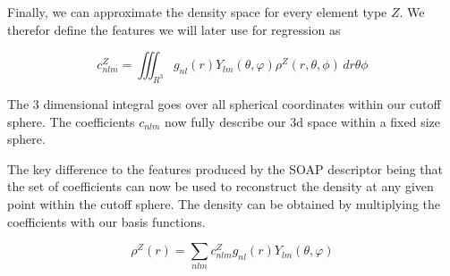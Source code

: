 Finally, we can approximate the density space for every element type $Z$.
We therefor define the features we will later use for regression as

$$ c_{nlm}^Z = \iiint_{R^3} g_{nl}(r) Y_{lm}(\theta, \varphi) \rho^Z(r, \theta, \phi)  \,dr\theta\phi   $$

The 3 dimensional integral goes over all spherical coordinates within our cutoff sphere.
The coefficients $c_{nlm}$ now fully describe our 3d space within a fixed size sphere.

The key difference to the features produced by the SOAP descriptor being that the set of coefficients 
can now be used to reconstruct the density at any given point within the cutoff sphere.
The density can be obtained by multiplying the coefficients with our basis functions.

$$ \rho^Z(r) = \sum_{nlm} c^Z_{nlm} g_{nl}(r) Y_{lm}(\theta, \varphi) $$
